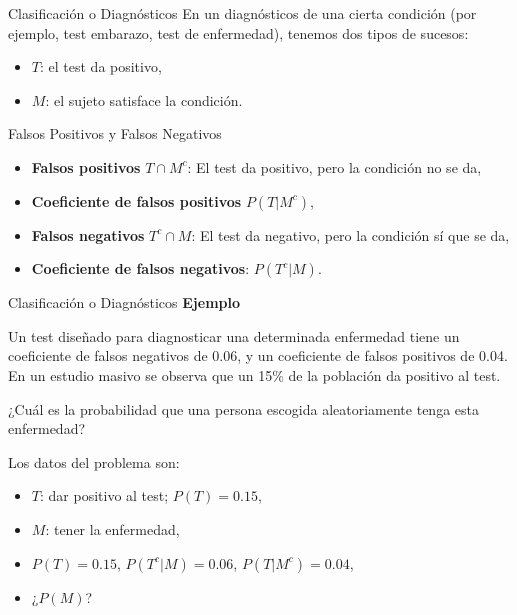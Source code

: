 \documentclass[
  ignorenonframetext,
]{beamer}
\providecommand{\tightlist}{%
  \setlength{\itemsep}{0pt}\setlength{\parskip}{0pt}}
\begin{document}
\begin{frame}{Clasificación o Diagnósticos}
\protect\hypertarget{clasificaciuxf3n-o-diagnuxf3sticos-6}{}
En un diagnósticos de una cierta condición (por ejemplo, test embarazo,
test de enfermedad), tenemos dos tipos de sucesos:

\begin{itemize}
\tightlist
\item
  \(T\): el test da positivo,
\item
  \(M\): el sujeto satisface la condición.
\end{itemize}

Falsos Positivos y Falsos Negativos

\begin{itemize}
\tightlist
\item
  \textbf{Falsos positivos} \(T\cap M^c\): El test da positivo, pero la
  condición no se da,
\item
  \textbf{Coeficiente de falsos positivos} \(P(T|M^c)\),
\item
  \textbf{Falsos negativos} \(T^c\cap M\): El test da negativo, pero la
  condición sí que se da,
\item
  \textbf{Coeficiente de falsos negativos}: \(P(T^c|M)\).
\end{itemize}
\end{frame}

\begin{frame}{Clasificación o Diagnósticos}
\protect\hypertarget{clasificaciuxf3n-o-diagnuxf3sticos-7}{}
\textbf{Ejemplo}

Un test diseñado para diagnosticar una determinada enfermedad tiene un
coeficiente de falsos negativos de 0.06, y un coeficiente de falsos
positivos de 0.04. En un estudio masivo se observa que un 15\% de la
población da positivo al test.

¿Cuál es la probabilidad que una persona escogida aleatoriamente tenga
esta enfermedad?

Los datos del problema son:

\begin{itemize}
\tightlist
\item
  \(T\): dar positivo al test; \(P(T)=0.15\),
\item
  \(M\): tener la enfermedad,
\item
  \(P(T)=0.15\), \(P(T^c|M)=0.06\), \(P(T|M^c)=0.04\),
\item
  ¿\(P(M)\)?
\end{itemize}
\end{frame}
\end{document}
